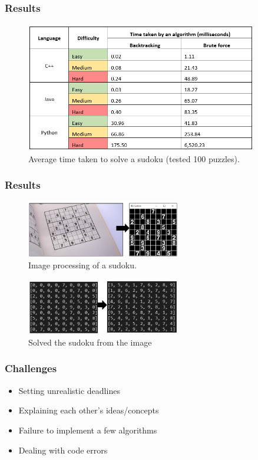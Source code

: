 \documentclass{beamer}
\begin{document}
\begin{frame}
     \frametitle{Results}   
		  \begin{figure}
		  \includegraphics[width=0.9\textwidth]{./week9_img/data.png}
		  \caption{Average time taken to solve a sudoku (tested 100 puzzles).}
		  \centering
		  \end{figure}
\end{frame}

\begin{frame}
	\frametitle{Results}
		  \begin{figure}
		  \includegraphics[width=0.6\textwidth]{./week9_img/transformation.png}
		  \caption{Image processing of a sudoku.}
		  \centering
		  \end{figure}

          \begin{figure}
            \includegraphics[width=0.6\textwidth]{./week9_img/solve.PNG}
          \caption{Solved the sudoku from the image}
          \centering
        \end{figure}
\end{frame}

\begin{frame}
    \frametitle{Challenges}   
    \begin{itemize}
         \item Setting unrealistic deadlines
         \item Explaining each other’s ideas/concepts
         \item Failure to implement a few algorithms
         \item Dealing with code errors
    \end{itemize}
\end{frame}
\end{document}
